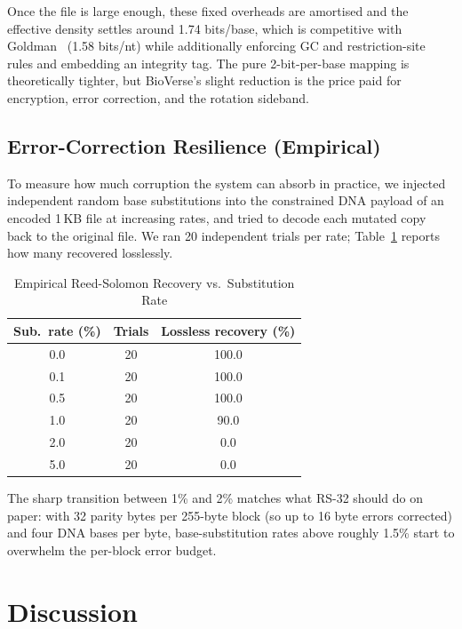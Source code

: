 \documentclass[conference]{IEEEtran}
\begin{document}
Once the file is large enough, these fixed overheads are amortised and the effective density settles around 1.74 bits/base, which is competitive with Goldman~\cite{b3} (1.58 bits/nt) while additionally enforcing GC and restriction-site rules and embedding an integrity tag. The pure 2-bit-per-base mapping is theoretically tighter, but BioVerse's slight reduction is the price paid for encryption, error correction, and the rotation sideband.

\subsection{Error-Correction Resilience (Empirical)}
\label{sec:ecc-empirical}

To measure how much corruption the system can absorb in practice, we injected independent random base substitutions into the constrained DNA payload of an encoded 1\,KB file at increasing rates, and tried to decode each mutated copy back to the original file. We ran 20 independent trials per rate; Table~\ref{tab:ecc-empirical} reports how many recovered losslessly.

\begin{table}[htbp]
\caption{Empirical Reed-Solomon Recovery vs.\ Substitution Rate}
\begin{center}
\begin{tabular}{|c|c|c|}
\hline
\textbf{Sub.\ rate (\%)} & \textbf{Trials} & \textbf{Lossless recovery (\%)} \\
\hline
0.0 & 20 & 100.0 \\
\hline
0.1 & 20 & 100.0 \\
\hline
0.5 & 20 & 100.0 \\
\hline
1.0 & 20 & \phantom{0}90.0 \\
\hline
2.0 & 20 & \phantom{00}0.0 \\
\hline
5.0 & 20 & \phantom{00}0.0 \\
\hline
\end{tabular}
\label{tab:ecc-empirical}
\end{center}
\end{table}

The sharp transition between 1\% and 2\% matches what RS-32 should do on paper: with 32 parity bytes per 255-byte block (so up to 16 byte errors corrected) and four DNA bases per byte, base-substitution rates above roughly 1.5\% start to overwhelm the per-block error budget.

\section{Discussion}
\end{document}
